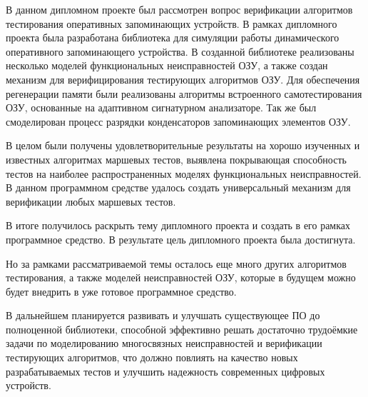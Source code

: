 
В данном дипломном проекте был рассмотрен вопрос верификации алгоритмов тестирования оперативных запоминающих устройств. В рамках дипломного проекта была разработана библиотека для симуляции работы динамического оперативного запоминающего устройства. В созданной библиотеке реализованы несколько моделей функциональных неисправностей ОЗУ, а также создан механизм для верифицирования тестирующих алгоритмов ОЗУ. Для обеспечения регенерации памяти были реализованы алгоритмы встроенного самотестирования ОЗУ, основанные на адаптивном сигнатурном анализаторе. Так же был смоделирован процесс разрядки конденсаторов запоминающих элементов ОЗУ.

В целом были получены удовлетворительные результаты на хорошо изученных и известных алгоритмах маршевых тестов, выявлена покрывающая способность тестов на наиболее распространенных моделях функциональных неисправностей. В данном программном средстве удалось создать универсальный механизм для верификации любых маршевых тестов.

В итоге получилось раскрыть тему дипломного проекта и создать в его рамках программное средство. В результате цель дипломного проекта была достигнута.

Но за рамками рассматриваемой темы осталось еще много других алгоритмов тестирования, а также моделей неисправностей ОЗУ, которые в будущем можно будет внедрить в уже готовое программное средство. 

В дальнейшем планируется развивать и улучшать существующее ПО до полноценной библиотеки, способной эффективно решать достаточно трудоёмкие задачи по моделированию многосвязных неисправностей и верификации тестирующих алгоритмов, что должно повлиять на качество новых разрабатываемых тестов и улучшить надежность современных цифровых устройств.



